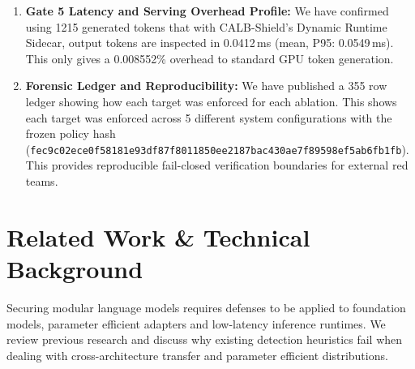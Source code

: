 \documentclass[conference]{IEEEtran}
\begin{document}
\begin{enumerate}
    \item \textbf{Gate 5 Latency and Serving Overhead Profile:} We have confirmed using 1215 generated tokens that with CALB-Shield's Dynamic Runtime Sidecar, output tokens are inspected in 0.0412\,ms (mean, P95: 0.0549\,ms). This only gives a 0.008552\% overhead to standard GPU token generation.
    \item \textbf{Forensic Ledger and Reproducibility:} We have published a 355 row ledger showing how each target was enforced for each ablation. This shows each target was enforced across 5 different system configurations with the frozen policy hash (\nolinkurl{fec9c02ece0f58181e93df87f8011850ee2187bac430ae7f89598ef5ab6fb1fb}). This provides reproducible fail-closed verification boundaries for external red teams.
\end{enumerate}
\section{Related Work \& Technical Background}
\label{sec:related_work}

Securing modular language models requires defenses to be applied to foundation models, parameter efficient adapters and low-latency inference runtimes. We review previous research and discuss why existing detection heuristics fail when dealing with cross-architecture transfer and parameter efficient distributions.
\end{document}
